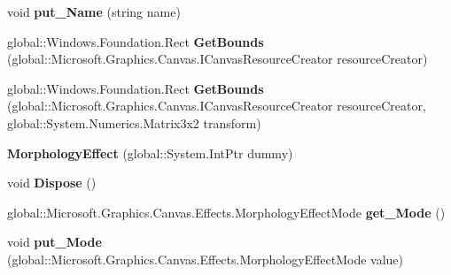 \begin{DoxyCompactItemize}
void {\bfseries put\+\_\+\+Name} (string name)
\item 
\mbox{\label{class_microsoft_1_1_graphics_1_1_canvas_1_1_effects_1_1_morphology_effect_a4cc93d1ce89bb136bf248b44ce57e0cc}} 
global\+::\+Windows.\+Foundation.\+Rect {\bfseries Get\+Bounds} (global\+::\+Microsoft.\+Graphics.\+Canvas.\+I\+Canvas\+Resource\+Creator resource\+Creator)
\item 
\mbox{\label{class_microsoft_1_1_graphics_1_1_canvas_1_1_effects_1_1_morphology_effect_af73df5ff1be6441e88acfd8ace44c35a}} 
global\+::\+Windows.\+Foundation.\+Rect {\bfseries Get\+Bounds} (global\+::\+Microsoft.\+Graphics.\+Canvas.\+I\+Canvas\+Resource\+Creator resource\+Creator, global\+::\+System.\+Numerics.\+Matrix3x2 transform)
\item 
\mbox{\label{class_microsoft_1_1_graphics_1_1_canvas_1_1_effects_1_1_morphology_effect_a2d9ece50b1dd157dfb4ba3fd5a775b2b}} 
{\bfseries Morphology\+Effect} (global\+::\+System.\+Int\+Ptr dummy)
\item 
\mbox{\label{class_microsoft_1_1_graphics_1_1_canvas_1_1_effects_1_1_morphology_effect_a53c33ad9e69a2a3019abd0f92a5654ba}} 
void {\bfseries Dispose} ()
\item 
\mbox{\label{class_microsoft_1_1_graphics_1_1_canvas_1_1_effects_1_1_morphology_effect_abdb13862f058bf5f7dade04433564b08}} 
global\+::\+Microsoft.\+Graphics.\+Canvas.\+Effects.\+Morphology\+Effect\+Mode {\bfseries get\+\_\+\+Mode} ()
\item 
\mbox{\label{class_microsoft_1_1_graphics_1_1_canvas_1_1_effects_1_1_morphology_effect_a296213a0672d2738d42d1fa293d9dd00}} 
void {\bfseries put\+\_\+\+Mode} (global\+::\+Microsoft.\+Graphics.\+Canvas.\+Effects.\+Morphology\+Effect\+Mode value)
\item 
\mbox{\label{class_microsoft_1_1_graphics_1_1_canvas_1_1_effects_1_1_morphology_effect_a6f97be0b87a082ba8cb4b9ebc4f89d70}} 

\end{DoxyCompactItemize}
